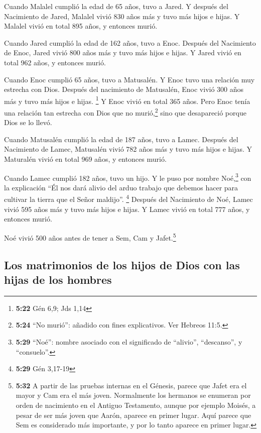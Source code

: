  Cuando Malalel cumplió la edad de 65 años, tuvo a Jared.
 Y después del Nacimiento de Jared, Malalel vivió 830
años más y tuvo más hijos e hijas.  Y Malalel vivió en
total 895 años, y entonces murió.

 Cuando Jared cumplió la edad de 162 años, tuvo a Enoc.
 Después del Nacimiento de Enoc, Jared vivió 800 años más
y tuvo más hijos e hijas.  Y Jared vivió en total 962
años, y entonces murió.

 Cuando Enoc cumplió 65 años, tuvo a Matusalén.
 Y Enoc tuvo una relación muy estrecha con Dios. Después
del nacimiento de Matusalén, Enoc vivió 300 años más y tuvo más hijos e
hijas. \footnote{\textbf{5:22} Gén 6,9; Jds 1,14}  Y Enoc
vivió en total 365 años.  Pero Enoc tenía una relación
tan estrecha con Dios que no murió,\footnote{\textbf{5:24} ``No murió'':
  añadido con fines explicativos. Ver Hebreos 11:5.} sino que
desapareció porque Dios se lo llevó.

 Cuando Matusalén cumplió la edad de 187 años, tuvo a
Lamec.  Después del Nacimiento de Lamec, Matusalén vivió
782 años más y tuvo más hijos e hijas.  Y Maturalén vivió
en total 969 años, y entonces murió.

 Cuando Lamec cumplió 182 años, tuvo un hijo.
 Y le puso por nombre Noé,\footnote{\textbf{5:29}
  ``Noé'': nombre asociado con el significado de ``alivio'',
  ``descanso'', y ``consuelo''.} con la explicación ``Él nos dará alivio
del arduo trabajo que debemos hacer para cultivar la tierra que el Señor
maldijo''. \footnote{\textbf{5:29} Gén 3,17-19}  Después
del Nacimiento de Noé, Lamec vivió 595 años más y tuvo más hijos e
hijas.  Y Lamec vivió en total 777 años, y entonces
murió.

 Noé vivió 500 años antes de tener a Sem, Cam y
Jafet.\footnote{\textbf{5:32} A partir de las pruebas internas en el
  Génesis, parece que Jafet era el mayor y Cam era el más joven.
  Normalmente los hermanos se enumeran por orden de nacimiento en el
  Antiguo Testamento, aunque por ejemplo Moisés, a pesar de ser más
  joven que Aarón, aparece en primer lugar. Aquí parece que Sem es
  considerado más importante, y por lo tanto aparece en primer lugar.}

\hypertarget{los-matrimonios-de-los-hijos-de-dios-con-las-hijas-de-los-hombres}{%
\subsection{Los matrimonios de los hijos de Dios con las hijas de los
hombres}\label{los-matrimonios-de-los-hijos-de-dios-con-las-hijas-de-los-hombres}}

